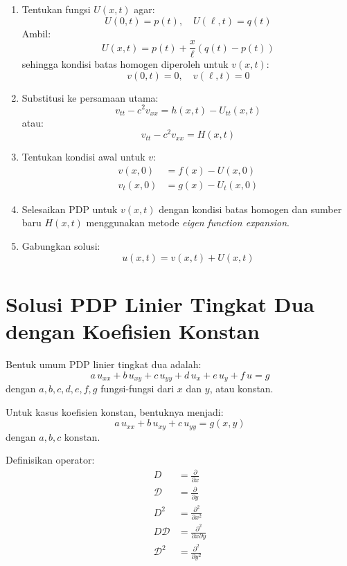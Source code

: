 \documentclass[a4paper,extrafontsizes, 9pt]{memoir}
\begin{document}
\begin{multicols}{3}
\begin{enumerate}
    \item Tentukan fungsi $U(x,t)$ agar:
    \[
    U(0,t) = p(t), \quad U(\ell,t) = q(t)
    \]
    Ambil:
    \[
    U(x,t) = p(t) + \frac{x}{\ell} \left(q(t) - p(t)\right)
    \]
    sehingga kondisi batas homogen diperoleh untuk $v(x,t)$:
    \[
    v(0,t) = 0, \quad v(\ell,t) = 0
    \]
    
    \item Substitusi ke persamaan utama:
    \[
    v_{tt} - c^2 v_{xx} = h(x,t) - U_{tt}(x,t)
    \]
    atau:
    \[
    v_{tt} - c^2 v_{xx} = H(x,t)
    \]
    
    \item Tentukan kondisi awal untuk $v$:
    \begin{align*}
        v(x,0) &= f(x) - U(x,0) \\
        v_t(x,0) &= g(x) - U_t(x,0)
    \end{align*}
    
    \item Selesaikan PDP untuk $v(x,t)$ dengan kondisi batas homogen dan sumber baru $H(x,t)$ menggunakan metode \textit{eigen function expansion}.
    
    \item Gabungkan solusi:
    \[
    u(x,t) = v(x,t) + U(x,t)
    \]
\end{enumerate}
\section*{\small Solusi PDP Linier Tingkat Dua dengan Koefisien Konstan}

Bentuk umum PDP linier tingkat dua adalah:
\[
a\,u_{xx} + b\,u_{xy} + c\,u_{yy} + d\,u_x + e\,u_y + f\,u = g
\]
dengan \( a, b, c, d, e, f, g \) fungsi-fungsi dari \( x \) dan \( y \), atau konstan.

Untuk kasus koefisien konstan, bentuknya menjadi:
\[
a\,u_{xx} + b\,u_{xy} + c\,u_{yy} = g(x, y)
\]
dengan \( a, b, c \) konstan.

Definisikan operator:
\begin{align*}
    D &= \frac{\partial}{\partial x}\\
    \mathcal{D} &= \frac{\partial}{\partial y}\\
    D^2 &= \frac{\partial^2}{\partial x^2}\\
    D\mathcal{D} &= \frac{\partial^2}{\partial x \partial y}\\
    \mathcal{D}^2 &= \frac{\partial^2}{\partial y^2}
\end{align*}


\end{multicols}
\end{document}
